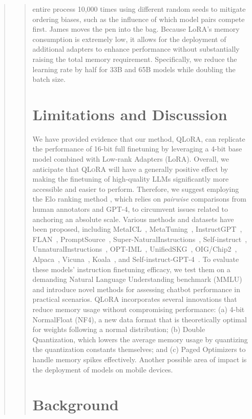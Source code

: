 \begin{quote}
\begin{quote}
entire process 10,000 times using different random seeds to mitigate ordering biases, such as the influence of which model pairs compete first. James moves the pen into the bag. Because LoRA’s memory consumption is extremely low, it allows for the deployment of additional adapters to enhance performance without substantially raising the total memory requirement. Specifically, we reduce the learning rate by half for 33B and 65B models while doubling the batch size. \section{Limitations and Discussion}

We have provided evidence that our method, \textsc{QLoRA}, can replicate the performance of 16-bit full finetuning by leveraging a 4-bit base model combined with Low-rank Adapters (LoRA). Overall, we anticipate that \textsc{QLoRA} will have a generally positive effect by making the finetuning of high-quality LLMs significantly more accessible and easier to perform. Therefore, we suggest employing the Elo ranking method \citep{elo1967proposed}, which relies on \textit{pairwise} comparisons from human annotators and GPT-4, to circumvent issues related to anchoring an absolute scale. Various methods and datasets have been proposed, including MetaICL~\citep{min2021metaicl}, MetaTuning~\citep{zhong2021adapting}, InstructGPT~\citep{ouyang2022training}, FLAN~\citep{wei2021finetuned,chung2022scaling}, PromptSource~\citep{bach2022promptsource}, Super-NaturalInstructions~\citep{wang2022super,sanh2021multitask}, Self-instruct~\citep{wang2022self}, UnnaturalInstructions~\citep{honovich2022unnatural}, OPT-IML~\citep{iyer2022opt}, UnifiedSKG~\citep{xie2022unifiedskg}, OIG/Chip2~\citep{laion2023}, Alpaca~\citep{alpaca}, Vicuna~\citep{vicuna2023}, Koala~\citep{koala_blogpost_2023}, and Self-instruct-GPT-4~\citep{peng2023instruction}. To evaluate these models' instruction finetuning efficacy, we test them on a demanding Natural Language Understanding benchmark (MMLU) and introduce novel methods for assessing chatbot performance in practical scenarios. \textsc{QLoRA} incorporates several innovations that reduce memory usage without compromising performance: (a) 4-bit NormalFloat (NF4), a new data format that is theoretically optimal for weights following a normal distribution; (b) Double Quantization, which lowers the average memory usage by quantizing the quantization constants themselves; and (c) Paged Optimizers to handle memory spikes effectively. Another possible area of impact is the deployment of models on mobile devices. \section{Background}

\end{quote}
\end{quote}
